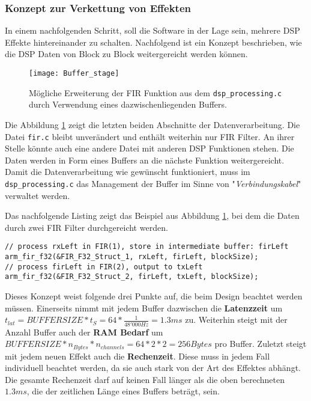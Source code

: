 \subsubsection{Konzept zur Verkettung von Effekten}
\label{sec:DSPChaining}

In einem nachfolgenden Schritt, soll die Software in der Lage sein, mehrere DSP Effekte hintereinander zu schalten. Nachfolgend ist ein Konzept beschrieben, wie die DSP Daten von Block zu Block weitergereicht werden können.

\begin{figure}[H]
	\centering
	\texttt{[image: Buffer\_stage]}
	\caption{Mögliche Erweiterung der FIR Funktion aus dem \texttt{dsp\_processing.c} durch Verwendung eines dazwischenliegenden Buffers.}
	\label{pic:Buffer_stage}
\end{figure}

Die Abbildung \ref{pic:Buffer_stage} zeigt die letzten beiden Abschnitte der Datenverarbeitung. Die Datei \texttt{fir.c} bleibt unverändert und enthält weiterhin nur FIR Filter. An ihrer Stelle könnte auch eine andere Datei mit anderen DSP Funktionen stehen.
Die Daten werden in Form eines Buffers an die nächste Funktion weitergereicht.
Damit die Datenverarbeitung wie gewünscht funktioniert, muss im \texttt{dsp\_processing.c} das Management der Buffer im Sinne von "\textit{Verbindungskabel}" verwaltet werden.

Das nachfolgende Listing zeigt das Beispiel aus Abbildung \ref{pic:Buffer_stage}, bei dem die Daten durch zwei FIR Filter durchgereicht werden.

\begin{lstlisting}[style=Cuvision, caption={Daten mittels Buffer und zwei FIR Filter bearbeiten}]
// process rxLeft in FIR(1), store in intermediate buffer: firLeft
arm_fir_f32(&FIR_F32_Struct_1, rxLeft, firLeft, blockSize);
// process firLeft in FIR(2), output to txLeft
arm_fir_f32(&FIR_F32_Struct_2, firLeft, txLeft, blockSize);

\end{lstlisting}

Dieses Konzept weist folgende drei Punkte auf, die beim Design beachtet werden müssen.
Einerseits nimmt mit jedem Buffer dazwischen die \textbf{Latenzzeit} um $t_{lat}=BUFFERSIZE*t_S=64*\frac{1}{48'000\si{Hz}}=1.3\si{ms}$ zu.
Weiterhin steigt mit der Anzahl Buffer auch der \textbf{RAM Bedarf} um $BUFFERSIZE*n_{Bytes}*n_{channels}=64*2*2=256\si{Bytes}$ pro Buffer.
Zuletzt steigt mit jedem neuen Effekt auch die \textbf{Rechenzeit}. Diese muss in jedem Fall individuell beachtet werden, da sie auch stark von der Art des Effektes abhängt.
Die gesamte Rechenzeit darf auf keinen Fall länger als die oben berechneten $1.3\si{ms}$, die der zeitlichen Länge eines Buffers beträgt, sein.

